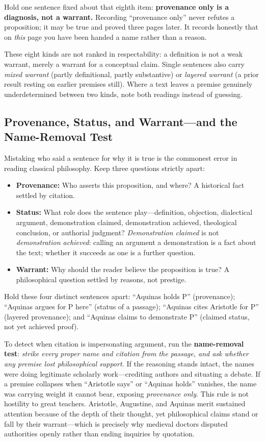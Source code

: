 Hold one sentence fixed about that eighth item: \textbf{provenance only is a diagnosis, not a warrant.} Recording ``provenance only'' never refutes a proposition; it may be true and proved three pages later. It records honestly that on \emph{this} page you have been handed a name rather than a reason.

These eight kinds are not ranked in respectability: a definition is not a weak warrant, merely a warrant for a conceptual claim. Single sentences also carry \emph{mixed warrant} (partly definitional, partly substantive) or \emph{layered warrant} (a prior result resting on earlier premises still). Where a text leaves a premise genuinely underdetermined between two kinds, note both readings instead of guessing.

\subsection{Provenance, Status, and Warrant---and the Name-Removal Test}

Mistaking who said a sentence for why it is true is the commonest error in reading classical philosophy. Keep three questions strictly apart:

\begin{itemize}
\item \textbf{Provenance:} Who asserts this proposition, and where? A historical fact settled by citation.
\item \textbf{Status:} What role does the sentence play---definition, objection, dialectical argument, demonstration claimed, demonstration achieved, theological conclusion, or authorial judgment? \emph{Demonstration claimed} is not \emph{demonstration achieved}: calling an argument a demonstration is a fact about the text; whether it succeeds as one is a further question.
\item \textbf{Warrant:} Why should the reader believe the proposition is true? A philosophical question settled by reasons, not prestige.
\end{itemize}

Hold these four distinct sentences apart: ``Aquinas holds P'' (provenance); ``Aquinas argues for P here'' (status of a passage); ``Aquinas cites Aristotle for P'' (layered provenance); and ``Aquinas claims to demonstrate P'' (claimed status, not yet achieved proof).

To detect when citation is impersonating argument, run the \textbf{name-removal test}: \emph{strike every proper name and citation from the passage, and ask whether any premise lost philosophical support.} If the reasoning stands intact, the names were doing legitimate scholarly work---crediting authors and situating a debate. If a premise collapses when ``Aristotle says'' or ``Aquinas holds'' vanishes, the name was carrying weight it cannot bear, exposing \emph{provenance only}. This rule is not hostility to great teachers. Aristotle, Augustine, and Aquinas merit sustained attention because of the depth of their thought, yet philosophical claims stand or fall by their warrant---which is precisely why medieval doctors disputed authorities openly rather than ending inquiries by quotation.


